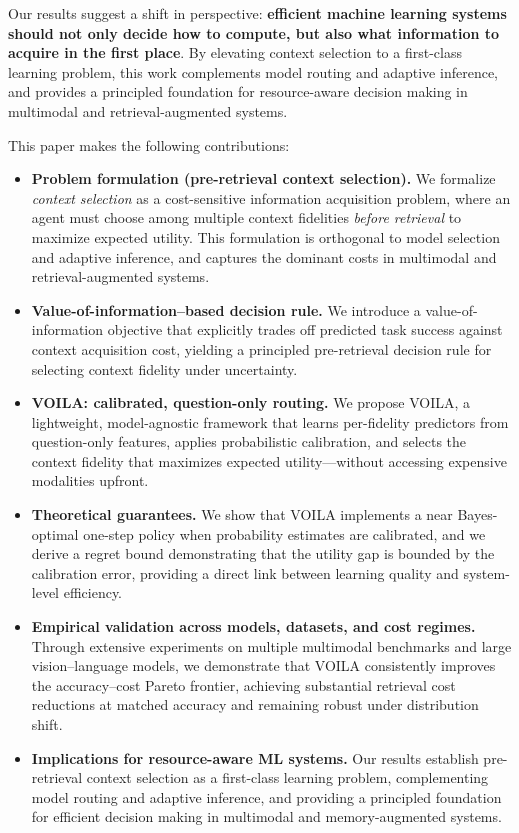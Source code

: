 Our results suggest a shift in perspective: \textbf{efficient machine learning systems should not only decide how to compute, but also what information to acquire in the first place}. By elevating context selection to a first-class learning problem, this work complements model routing and adaptive inference, and provides a principled foundation for resource-aware decision making in multimodal and retrieval-augmented systems.

This paper makes the following contributions:
\begin{itemize}
    \item \textbf{Problem formulation (pre-retrieval context selection).}
    We formalize \emph{context selection} as a cost-sensitive information acquisition problem, where an agent must choose among multiple context fidelities \emph{before retrieval} to maximize expected utility. This formulation is orthogonal to model selection and adaptive inference, and captures the dominant costs in multimodal and retrieval-augmented systems.

    \item \textbf{Value-of-information–based decision rule.}
    We introduce a value-of-information objective that explicitly trades off predicted task success against context acquisition cost, yielding a principled pre-retrieval decision rule for selecting context fidelity under uncertainty.

    \item \textbf{VOILA: calibrated, question-only routing.}
    We propose VOILA, a lightweight, model-agnostic framework that learns per-fidelity predictors from question-only features, applies probabilistic calibration, and selects the context fidelity that maximizes expected utility—without accessing expensive modalities upfront.

    \item \textbf{Theoretical guarantees.}
    We show that VOILA implements a near Bayes-optimal one-step policy when probability estimates are calibrated, and we derive a regret bound demonstrating that the utility gap is bounded by the calibration error, providing a direct link between learning quality and system-level efficiency.

    \item \textbf{Empirical validation across models, datasets, and cost regimes.}
    Through extensive experiments on multiple multimodal benchmarks and large vision--language models, we demonstrate that VOILA consistently improves the accuracy--cost Pareto frontier, achieving substantial retrieval cost reductions at matched accuracy and remaining robust under distribution shift.

    \item \textbf{Implications for resource-aware ML systems.}
    Our results establish pre-retrieval context selection as a first-class learning problem, complementing model routing and adaptive inference, and providing a principled foundation for efficient decision making in multimodal and memory-augmented systems.
\end{itemize}




